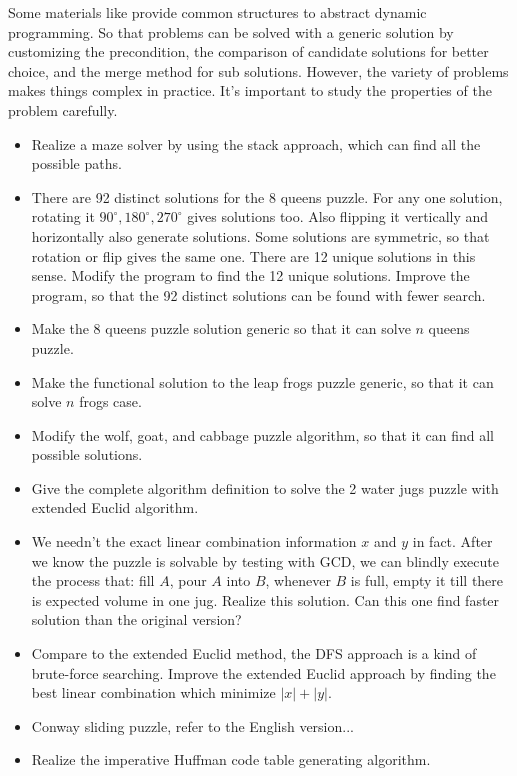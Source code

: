 \documentclass[UTF8]{article}
\begin{document}
Some materials like \cite{algorithms-fp} provide common structures to abstract dynamic programming.
So that problems can be solved with a generic solution by customizing the precondition, the
comparison of candidate solutions for better choice, and the merge method for sub solutions.
However, the variety of problems makes things complex in practice. It's important to study
the properties of the problem carefully.

\begin{Exercise}
\begin{itemize}
\item Realize a maze solver by using the stack approach, which can find all the possible paths.
\item There are 92 distinct solutions for the 8 queens puzzle. For any one solution, rotating it
$90^{\circ}, 180^{\circ}, 270^{\circ}$ gives solutions too. Also flipping it vertically and horizontally
also generate solutions. Some solutions are symmetric, so that rotation or flip gives the same one.
There are 12 unique solutions in this sense. Modify the program to find the 12 unique solutions.
Improve the program, so that the 92 distinct solutions can be found with fewer search.
\item Make the 8 queens puzzle solution generic so that it can solve $n$ queens puzzle.
\item Make the functional solution to the leap frogs puzzle generic, so that it can solve $n$
frogs case.
\item Modify the wolf, goat, and cabbage puzzle algorithm, so that it can find all possible
solutions.
\item Give the complete algorithm definition to solve the 2 water jugs puzzle with extended
Euclid algorithm.
\item We needn't the exact linear combination information $x$ and $y$ in fact. After we know
the puzzle is solvable by testing with GCD, we can blindly execute the process that:
fill $A$, pour $A$ into $B$, whenever $B$ is full, empty it till there is expected volume
in one jug. Realize this solution. Can this one find faster solution than the original
version?
\item Compare to the extended Euclid method, the DFS approach is a kind of brute-force searching.
Improve the extended Euclid approach by finding the best linear combination which minimize
$|x| + |y|$.
\item Conway sliding puzzle, refer to the English version...
\item Realize the imperative Huffman code table generating algorithm.

\end{itemize}
\end{Exercise}
\end{document}
